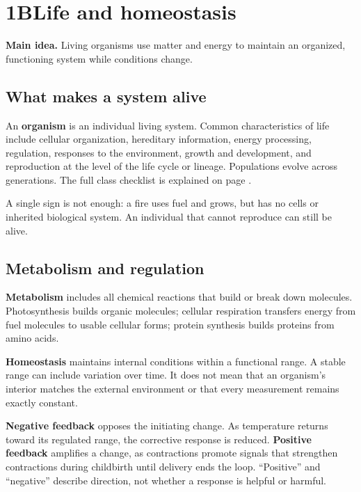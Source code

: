 \documentclass[11pt,letterpaper]{article}
\newcommand{\pagechapter}[2]{\clearpage\section*{#1}\phantomsection\label{#2}\addcontentsline{toc}{section}{#1}}
\newcommand{\idea}[1]{\textbf{Main idea.} #1\par}
\newcommand{\ico}[3][forest]{{\fontsize{#3}{#3}\selectfont\textcolor{#1}{#2}}}
\newcommand{\pn}[3]{\ico[#1]{#2}{19pt}\\[2pt]#3}
\begin{document}
\pagechapter{1B\quad Life and homeostasis}{oneb}
\idea{Living organisms use matter and energy to maintain an organized, functioning system while conditions change.}
\subsection*{What makes a system alive}
An \textbf{organism} is an individual living system. Common characteristics of life include cellular organization, hereditary information, energy processing, regulation, responses to the environment, growth and development, and reproduction at the level of the life cycle or lineage. Populations evolve across generations. The full class checklist is explained on page \pageref{lifecheck}.

A single sign is not enough: a fire uses fuel and grows, but has no cells or inherited biological system. An individual that cannot reproduce can still be alive.
\subsection*{Metabolism and regulation}
\textbf{Metabolism} includes all chemical reactions that build or break down molecules. Photosynthesis builds organic molecules; cellular respiration transfers energy from fuel molecules to usable cellular forms; protein synthesis builds proteins from amino acids.

\textbf{Homeostasis} maintains internal conditions within a functional range. A stable range can include variation over time. It does not mean that an organism's interior matches the external environment or that every measurement remains exactly constant.
\begin{center}
\par
\end{center}
\textbf{Negative feedback} opposes the initiating change. As temperature returns toward its regulated range, the corrective response is reduced. \textbf{Positive feedback} amplifies a change, as contractions promote signals that strengthen contractions during childbirth until delivery ends the loop. ``Positive'' and ``negative'' describe direction, not whether a response is helpful or harmful.
\end{document}
